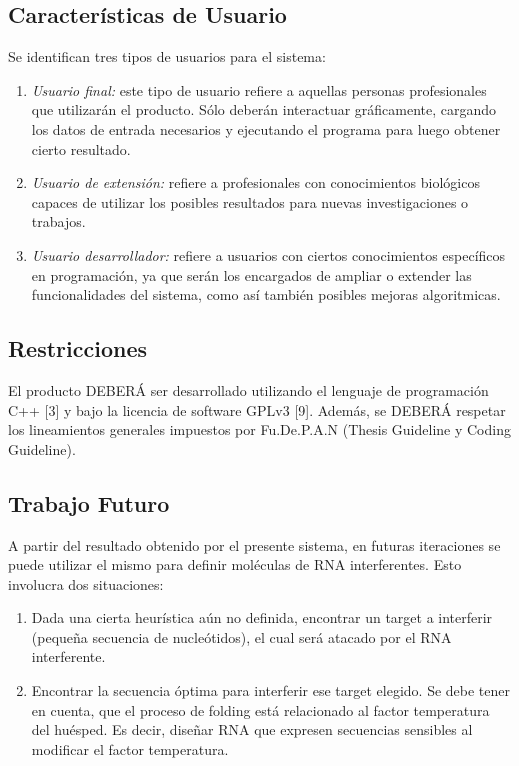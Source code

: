 \documentclass[12pt,a4paper,english,spanish]{article}
\begin{document}
\subsection{Características de Usuario}
	Se identifican tres tipos de usuarios para el sistema:
	\begin{enumerate}
 		\item \textit{Usuario final:} este tipo de usuario refiere a aquellas personas profesionales que utilizarán el 										producto. Sólo deberán interactuar gráficamente, cargando los datos de entrada 										necesarios y ejecutando el programa para luego obtener cierto resultado. 
		\item \textit{Usuario de extensión:} refiere a profesionales con conocimientos biológicos capaces de utilizar los 												posibles resultados para nuevas investigaciones o trabajos.
		\item \textit{Usuario desarrollador:} refiere a usuarios con ciertos conocimientos específicos en programación, 											ya que serán los encargados de ampliar o extender las funcionalidades del 												sistema, como así también posibles mejoras algoritmicas.
	\end{enumerate}

\subsection{Restricciones}
	El producto DEBERÁ ser desarrollado utilizando el lenguaje de programación C++ [3] y bajo la licencia de software 		GPLv3 [9]. Además, se DEBERÁ respetar los lineamientos generales impuestos por Fu.De.P.A.N (Thesis Guideline y Coding Guideline). 


\subsection{Trabajo Futuro}
A partir del resultado obtenido por el presente sistema, en futuras iteraciones se puede utilizar el mismo para definir moléculas de RNA interferentes. Esto involucra dos situaciones:
\begin{enumerate}
	\item Dada una cierta heurística aún no definida, encontrar un target a interferir (pequeña secuencia de nucleótidos), el cual será atacado por el RNA 			interferente.
	\item Encontrar la secuencia óptima para interferir ese target elegido. Se debe tener en cuenta, que el proceso de folding está relacionado 			al factor temperatura del huésped. Es decir, diseñar RNA que expresen secuencias sensibles al modificar el factor temperatura.
\end{enumerate}
\end{document}
